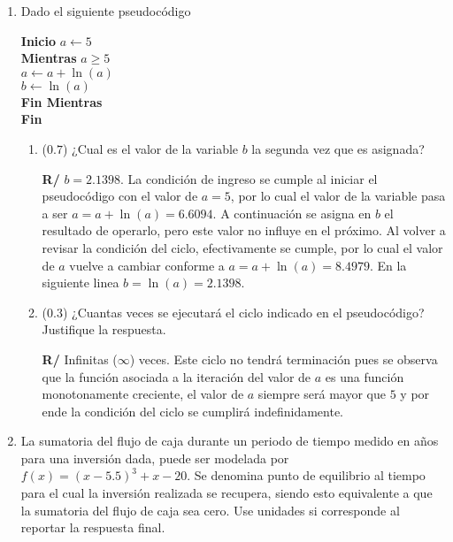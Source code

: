 \documentclass[12pt]{article}
\begin{document}
\vspace{-.5cm}
  \begin{enumerate}[leftmargin=*,widest=9]


    \item Dado el siguiente pseudocódigo

\textbf{Inicio}
\(a\gets 5\)\\
\textbf{Mientras} \(a \geq 5\)\\
\hspace*{1cm}\(a \gets a + \ln(a)\)\\
\hspace*{1cm}\(b \gets \ln(a) \)\\
\textbf{Fin Mientras}\\
\textbf{Fin}\\



    \begin{enumerate}[label=\alph*]
    \item (\(0.7\)) ¿Cual es el valor de la variable \(b\) la segunda vez que es asignada?


     \textbf{R/} \(b=2.1398\). La condición de ingreso se cumple al iniciar el pseudocódigo con el valor de \(a = 5\), por lo cual el valor de la variable pasa a ser \(a = a + \ln(a) = 6.6094\). A continuación se asigna en \(b\) el resultado de operarlo, pero este valor no influye en el próximo. Al volver a revisar la condición del ciclo, efectivamente se cumple, por lo cual el valor de \(a\) vuelve a cambiar conforme a \(a= a+\ln(a) =  8.4979\). En la siguiente linea \(b = \ln(a) = 2.1398 \).

    \item (\(0.3\)) ¿Cuantas veces se ejecutará el ciclo indicado en el pseudocódigo? Justifique la respuesta.


     \textbf{R/} Infinitas (\(\infty\)) veces. Este ciclo no tendrá terminación pues se observa que la función asociada a la iteración del valor de \(a\) es una función monotonamente creciente, el valor de \(a\) siempre será mayor que \(5\) y por ende la condición del ciclo se cumplirá indefinidamente.
    \end{enumerate}


    \item La sumatoria del flujo de caja durante un periodo de tiempo medido en años para una inversión dada, puede ser modelada por \(f(x) = (x-5.5)^3 + x - 20\). Se denomina punto de equilibrio al tiempo para el cual la inversión realizada se recupera, siendo esto equivalente a que la sumatoria del flujo de caja sea cero. Use unidades si corresponde al reportar la respuesta final.


\end{enumerate}
\end{document}
